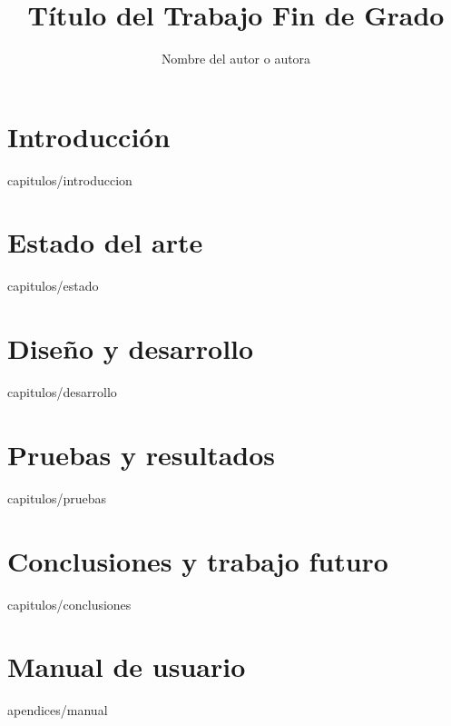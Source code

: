 \documentclass[epsbased,copyright,final,printable,extendedindex,firstnumbered,tfg,overleaf]{tfgtfmthesisuam}
\title{Título del Trabajo Fin de Grado}
\author{Nombre del autor o autora}
\begin{document}
\chapter{Introducción\label{CAP:INTRO}}{capitulos/introduccion}
\chapter{Estado del arte\label{CAP:ESTADO}}{capitulos/estado}
\chapter{Diseño y desarrollo\label{CAP:DESARROLLO}}{capitulos/desarrollo}
\chapter{Pruebas y resultados\label{CAP:PRUEBAS}}{capitulos/pruebas}
\chapter{Conclusiones y trabajo futuro\label{CAP:CONCLUSIONES}}{capitulos/conclusiones}

\appendix

\chapter{Manual de usuario\label{AP:MANUAL}}{apendices/manual}
\end{document}
